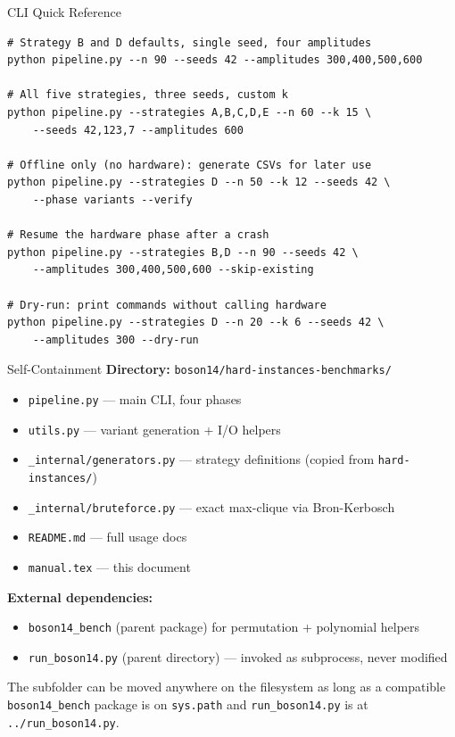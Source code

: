 \documentclass[aspectratio=169]{beamer}
\begin{document}

\begin{frame}[fragile]{CLI Quick Reference}
\begin{lstlisting}[style=shell,numbers=none]
# Strategy B and D defaults, single seed, four amplitudes
python pipeline.py --n 90 --seeds 42 --amplitudes 300,400,500,600

# All five strategies, three seeds, custom k
python pipeline.py --strategies A,B,C,D,E --n 60 --k 15 \
    --seeds 42,123,7 --amplitudes 600

# Offline only (no hardware): generate CSVs for later use
python pipeline.py --strategies D --n 50 --k 12 --seeds 42 \
    --phase variants --verify

# Resume the hardware phase after a crash
python pipeline.py --strategies B,D --n 90 --seeds 42 \
    --amplitudes 300,400,500,600 --skip-existing

# Dry-run: print commands without calling hardware
python pipeline.py --strategies D --n 20 --k 6 --seeds 42 \
    --amplitudes 300 --dry-run
\end{lstlisting}
\end{frame}


\begin{frame}{Self-Containment}
    \textbf{Directory:} \texttt{boson14/hard-instances-benchmarks/}

    \begin{itemize}
        \item \texttt{pipeline.py} --- main CLI, four phases
        \item \texttt{utils.py} --- variant generation + I/O helpers
        \item \texttt{\_internal/generators.py} --- strategy definitions (copied from \texttt{hard-instances/})
        \item \texttt{\_internal/bruteforce.py} --- exact max-clique via Bron-Kerbosch
        \item \texttt{README.md} --- full usage docs
        \item \texttt{manual.tex} --- this document
    \end{itemize}

    \vspace{0.5em}
    \textbf{External dependencies:}
    \begin{itemize}
        \item \texttt{boson14\_bench} (parent package) for permutation + polynomial helpers
        \item \texttt{run\_boson14.py} (parent directory) --- invoked as subprocess, never modified
    \end{itemize}

    \vspace{0.5em}
    The subfolder can be moved anywhere on the filesystem as long as a compatible \texttt{boson14\_bench} package is on \texttt{sys.path} and \texttt{run\_boson14.py} is at \texttt{../run\_boson14.py}.
\end{frame}
\end{document}

